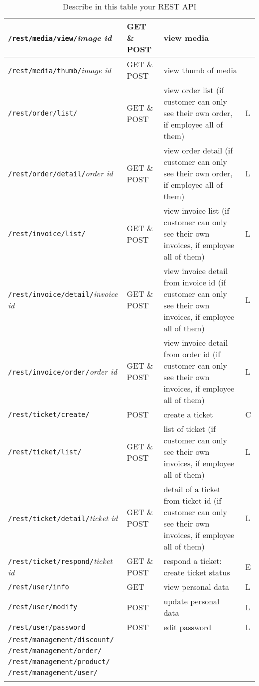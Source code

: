 \begin{longtable}{|p{}|p{} |p{}|p{}|}
\texttt{/rest/media/view/}\textit{image id} & GET \& POST &  view media &  \\\hline
\texttt{/rest/media/thumb/}\textit{image id} & GET \& POST & view thumb of media &  \\\hline
\texttt{/rest/order/list/} & GET \& POST & view order list (if customer can only see their own order, if employee all of them) & L\\\hline
\texttt{/rest/order/detail/}\textit{order id} & GET \& POST & view order detail (if customer can only see their own order, if employee all of them) & L\\\hline
\texttt{/rest/invoice/list/} & GET \& POST & view invoice list (if customer can only see their own invoices, if employee all of them) & L\\\hline
\texttt{/rest/invoice/detail/}\textit{invoice id} & GET \& POST & view invoice detail from invoice id (if customer can only see their own invoices, if employee all of them) & L\\\hline
\texttt{/rest/invoice/order/}\textit{order id} & GET \& POST & view invoice detail from order id (if customer can only see their own invoices, if employee all of them) & L\\\hline
\texttt{/rest/ticket/create/} & POST  & create a ticket & C \\\hline
\texttt{/rest/ticket/list/} & GET \& POST  & list of ticket (if customer can only see their own invoices, if employee all of them) & L \\\hline
\texttt{/rest/ticket/detail/}\textit{ticket id} & GET \& POST & detail of a ticket from ticket id (if customer can only see their own invoices, if employee all of them) & L \\\hline
\texttt{/rest/ticket/respond/}\textit{ticket id} & GET \& POST & respond a ticket: create ticket status & E \\\hline
\texttt{/rest/user/info} & GET & view personal data & L \\\hline
\texttt{/rest/user/modify} & POST & update personal data & L\\\hline
\texttt{/rest/user/password} & POST & edit password & L\\\hline
\texttt{/rest/management/discount/} & & &\\\hline
\texttt{/rest/management/order/} & & &\\\hline
\texttt{/rest/management/product/} & & &\\\hline
\texttt{/rest/management/user/} & & &\\\hline

\caption{Describe in this table your REST API}
\label{tab:termGlossary}
\end{longtable}
